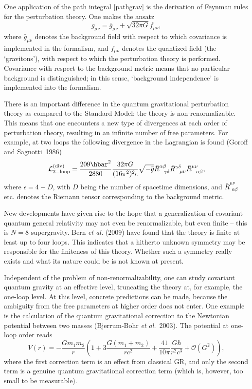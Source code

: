 \documentclass[12pt,a4paper]{article}
\newcommand{\be}{\begin{equation}}
\newcommand{\ee}{\end{equation}}
\newcommand{\lb}{\label}
\begin{document}
One application of the path integral \eqref{pathgrav} is the
derivation of Feynman rules for the perturbation theory. One makes the ansatz
\be
\lb{2.59}
g_{\mu\nu}=\bar{g}_{\mu\nu}+\sqrt{32\pi G}f_{\mu\nu},
\ee
where $\bar{g}_{\mu\nu}$ denotes the background field with respect to
which covariance is implemented in the
formalism, and $f_{\mu\nu}$ denotes the quantized field (the `gravitons'), with
respect to which the perturbation theory is performed.
Covariance with respect to the background metric means
that no particular background is distinguished; in this sense, `background
independence' is implemented into the formalism.

There is an important difference in the quantum gravitational
perturbation theory as compared to the Standard Model: the theory is
non-re\-norma\-lizable. This means that one encounters a new type of
divergences at each order of perturbation theory, resulting in an
infinite number of free parameters. 
For example, at two loops the following divergence in the Lagrangian
is found (Goroff and Sagnotti~1986) 
\be
\lb{2.79}
{\mathcal L}^{({\rm div})}_{2-{\rm loop}}=
\frac{209\hbar^2}{2880}\frac{32\pi G}{(16\pi^2)^2\epsilon}\sqrt{-\bar{g}}
\bar{R}^{\alpha\beta}_{\ \ \gamma\delta}
\bar{R}^{\gamma\delta}_{\ \ \mu\nu}\bar{R}^{\mu\nu}_{\ \ \alpha\beta} ,
\ee
where $\epsilon=4-D$, with $D$ being the number of spacetime
dimensions, and $\bar{R}^{\mu\nu}_{\ \ \alpha\beta}$ etc. denotes the
Riemann tensor corresponding to the background metric.

New developments have given rise to the hope that a generalization of
covariant quantum general relativity may not even be renormalizable,
but even finite -- this is $N=8$ supergravity. Bern {\em et al.}
(2009) have found that the theory is finite at least up to four
loops. This indicates that a hitherto unknown symmetry may be responsible
for the finiteness of this theory. Whether such a symmetry
really exists and what its nature could be is not known at present.

Independent of the problem of non-renormalizability, one can study
covariant quantum gravity at an effective level, truncating the theory
at, for example, the one-loop level. At this level, concrete
predictions can be made, because the ambiguity from the free
parameters at higher order does not enter. One example is the
calculation of the quantum gravitational correction to the Newtonian
potential between two masses (Bjerrum-Bohr {\em et al.}~2003).
The potential at one-loop order reads
\be
\lb{2.82}
V(r)=-\frac{Gm_1m_2}{r}\left(1+3\frac{G(m_1+m_2)}{rc^2}
+\frac{41}{10\pi}\frac{G\hbar}{r^2c^3}+{\mathcal O}(G^2)\right),
\ee
where the first correction term is an effect from classical GR, and
only the second term is a genuine quantum gravitational correction
term (which is, however, too small to be measurable). 
\end{document}
